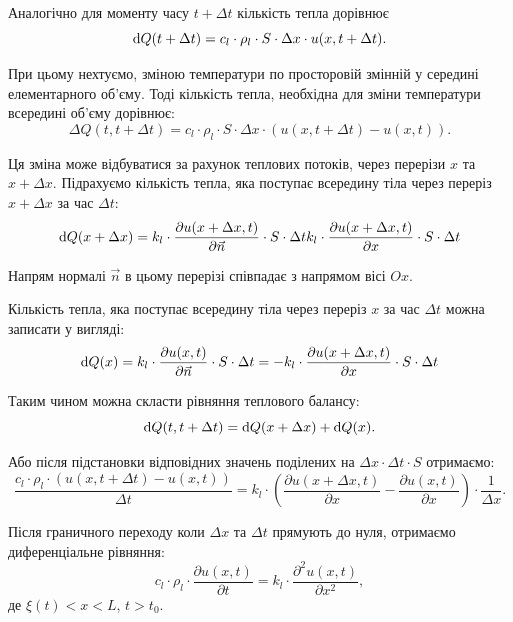 Аналогічно для моменту часу $t + \Delta t$ кількість тепла дорівнює
\begin{equation}
	\mathop{}\!\mathrm{d} Q(t + \Delta t) = c_l \cdot \rho_l \cdot S \cdot \Delta x \cdot u(x, t + \Delta t).
\end{equation}

При цьому нехтуємо, зміною температури по просторовій змінній у середині елементарного об'єму. Тоді кількість тепла, необхідна для зміни температури всередині об'єму дорівнює:
\begin{equation}
	\Delta Q(t, t + \Delta t) = c_l \cdot \rho_l \cdot S \cdot \Delta x \cdot (u(x, t + \Delta t) - u(x, t)).
\end{equation}

Ця зміна може відбуватися за рахунок теплових потоків, через перерізи $x$ та $x + \Delta x$. Підрахуємо кількість тепла, яка поступає всередину тіла через переріз $x + \Delta x$ за час $\Delta t$:
\begin{equation}
	\mathop{}\!\mathrm{d} Q(x + \Delta x) = k_l \cdot \frac{\partial u(x + \Delta x, t)}{\partial \vec n} \cdot S \cdot \Delta t k_l \cdot \frac{\partial u(x + \Delta x, t)}{\partial x} \cdot S \cdot \Delta t
\end{equation} 
  
Напрям нормалі $\vec n$ в цьому перерізі співпадає з напрямом вісі $Ox$. \medskip

Кількість тепла, яка поступає всередину тіла через переріз $x$ за час $\Delta t$ можна записати у вигляді:
\begin{equation}
	\mathop{}\!\mathrm{d} Q(x) = k_l \cdot \frac{\partial u(x, t)}{\partial \vec n} \cdot S \cdot \Delta t = - k_l \cdot \frac{\partial u(x + \Delta x, t)}{\partial x} \cdot S \cdot \Delta t
\end{equation} 

Таким чином можна скласти рівняння теплового балансу:
\begin{equation}
	\mathop{}\!\mathrm{d} Q(t, t + \Delta t) = \mathop{}\!\mathrm{d} Q(x + \Delta x) + \mathop{}\!\mathrm{d} Q(x).
\end{equation}
 
Або після підстановки відповідних значень поділених на $\Delta x \cdot \Delta t \cdot S$ отримаємо:
\begin{equation}
	\frac{c_l \cdot \rho_l \cdot (u(x, t + \Delta t) - u(x, t))}{\Delta t} = k_l \cdot \left( \frac{\partial u(x + \Delta x, t)}{\partial x} - \frac{\partial u(x, t)}{\partial x} \right) \cdot \frac{1}{\Delta x}.
\end{equation}
  
Після граничного переходу коли $\Delta x$ та $\Delta t$ прямують до нуля, отримаємо диференціальне рівняння:
\begin{equation}
	c_l \cdot \rho_l \cdot \frac{\partial u(x, t)}{\partial t} = k_l \cdot \frac{\partial^2 u(x, t)}{\partial x^2},
\end{equation}
де $\xi(t) < x < L$, $t > t_0$. \medskip

